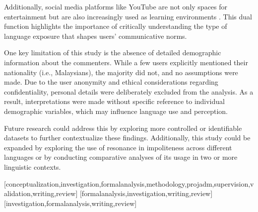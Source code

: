 \documentclass[english]{textolivre}
\begin{document}
Additionally, social media platforms like YouTube are not only spaces for entertainment but are also increasingly used as learning environments \cite{desouza2025, oliveira2023}. This dual function highlights the importance of critically understanding the type of language exposure that shapes users’ communicative norms.

One key limitation of this study is the absence of detailed demographic information about the commenters. While a few users explicitly mentioned their nationality (i.e., Malaysians), the majority did not, and no assumptions were made. Due to the user anonymity and ethical considerations regarding confidentiality, personal details were deliberately excluded from the analysis. As a result, interpretations were made without specific reference to individual demographic variables, which may influence language use and perception. 

Future research could address this by exploring more controlled or identifiable datasets to further contextualize these findings. Additionally, this study could be expanded by exploring the use of resonance in impoliteness across different languages or by conducting comparative analyses of its usage in two or more linguistic contexts.


\printbibliography\label{sec-bib}


\begin{contributors}
[conceptualization,investigation,formalanalysis,methodology,projadm,supervision,validation,writing,review]
[formalanalysis,investigation,writing,review]
[investigation,formalanalysis,writing,review]
\end{contributors}
\end{document}
